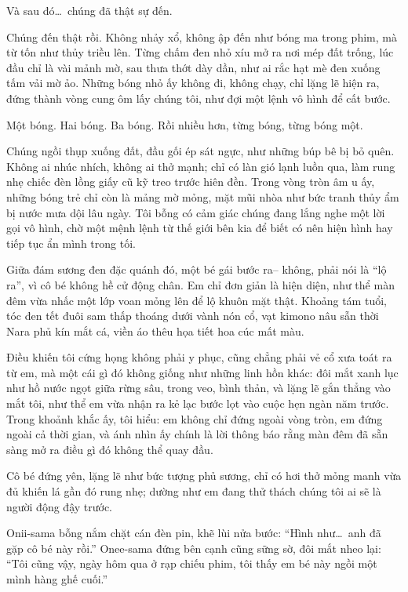 \documentclass[../main.tex]{subfiles}
\begin{document}
Và sau đó\dots\ chúng đã thật sự đến.

Chúng đến thật rồi. Không nhảy xổ, không ập đến như bóng ma trong phim, mà từ tốn như thủy triều lên. Từng chấm đen nhỏ xíu mở ra nơi mép đất trống, lúc đầu chỉ là vài mảnh mờ, sau thưa thớt dày dần, như ai rắc hạt mè đen xuống tấm vải mờ ảo. Những bóng nhỏ ấy không đi, không chạy, chỉ lặng lẽ hiện ra, đứng thành vòng cung ôm lấy chúng tôi, như đợi một lệnh vô hình để cất bước.

Một bóng. Hai bóng. Ba bóng. Rồi nhiều hơn, từng bóng, từng bóng một.

Chúng ngồi thụp xuống đất, đầu gối ép sát ngực, như những búp bê bị bỏ quên. Không ai nhúc nhích, không ai thở mạnh; chỉ có làn gió lạnh luồn qua, làm rung nhẹ chiếc đèn lồng giấy cũ kỹ treo trước hiên đền. Trong vòng tròn âm u ấy, những bóng trẻ chỉ còn là mảng mờ mỏng, mặt mũi nhòa như bức tranh thủy ẩm bị nước mưa dội lâu ngày. Tôi bỗng có cảm giác chúng đang lắng nghe một lời gọi vô hình, chờ một mệnh lệnh từ thế giới bên kia để biết có nên hiện hình hay tiếp tục ẩn mình trong tối.

Giữa đám sương đen đặc quánh đó, một bé gái bước ra-- không, phải nói là ``lộ ra'', vì cô bé không hề cử động chân. Em chỉ đơn giản là hiện diện, như thể màn đêm vừa nhấc một lớp voan mỏng lên để lộ khuôn mặt thật. Khoảng tám tuổi, tóc đen tết đuôi sam thấp thoáng dưới vành nón cổ, vạt kimono nâu sẫn thời Nara phủ kín mắt cá, viền áo thêu họa tiết hoa cúc mất màu.

Điều khiến tôi cứng họng không phải y phục, cũng chẳng phải vẻ cổ xưa toát ra từ em, mà một cái gì đó không giống như những linh hồn khác: đôi mắt xanh lục như hồ nước ngọt giữa rừng sâu, trong veo, bình thản, và lặng lẽ gắn thẳng vào mắt tôi, như thể em vừa nhận ra kẻ lạc bước lọt vào cuộc hẹn ngàn năm trước. Trong khoảnh khắc ấy, tôi hiểu: em không chỉ đứng ngoài vòng tròn, em đứng ngoài cả thời gian, và ánh nhìn ấy chính là lời thông báo rằng màn đêm đã sẵn sàng mở ra điều gì đó không thể quay đầu.

Cô bé đứng yên, lặng lẽ như bức tượng phủ sương, chỉ có hơi thở mỏng manh vừa đủ khiến lá gần đó rung nhẹ; dường như em đang thử thách chúng tôi ai sẽ là người động đậy trước.

Onii-sama bỗng nắm chặt cán đèn pin, khẽ lùi nửa bước: “Hình như\dots\ anh đã gặp cô bé này rồi.” Onee-sama đứng bên cạnh cũng sững sờ, đôi mắt nheo lại: ``Tôi cũng vậy, ngày hôm qua ở rạp chiếu phim, tôi thấy em bé này ngồi một mình hàng ghế cuối.''
\end{document}
